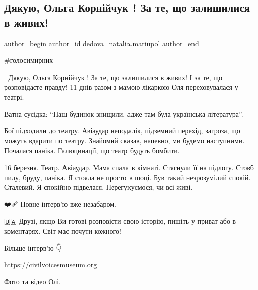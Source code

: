  
 
 
 
 

\subsection{Дякую, Ольга Корнійчук ! За те, що залишилися в живих!}
\label{sec:03_01_2023.fb.dedova_natalia.mariupol.1.dyakuyu__olga_korn_i}

\ifcmt
 author_begin
   author_id dedova_natalia.mariupol
 author_end
\fi

\#голосимирних

💛 Дякую, Ольга Корнійчук ! За те, що залишилися в живих! І за те, що
розповідаєте правду! 11 днів разом з мамою-лікаркою Оля переховувалася у
театрі. 

Ватна сусідка: \enquote{Наш будинок знищили, адже там була українська література}. 

Бої підходили до театру. Авіаудар неподалік, підземний перехід, загроза, що
можуть вдарити по театру. Знайомий сказав, напевно, ми будемо наступними.
Почалася паніка. Галюцинації, що театр будуть бомбити. 

16 березня. Театр. Авіаудар. Мама спала в кімнаті. Стягнули її на підлогу.
Стовб пилу, бруду, паніка. Я стояла не просто в шоці. Був такий незрозумілий
спокій. Сталевий. Я спокійно підвелася. Перегукуємося, чи всі живі. 

❤️🩹 Повне інтерв'ю вже незабаром. 

🇺🇦 Друзі, якщо Ви готові розповісти свою історію, пишіть у приват або в
коментарях. Світ має почути кожного! 

Більше інтерв'ю 👇

\url{https://civilvoicesmuseum.org}

Фото та відео Олі.
